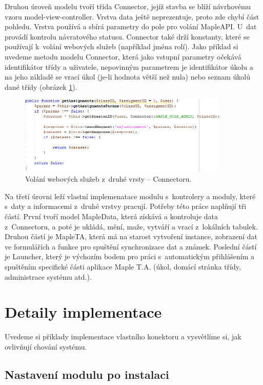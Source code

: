 \documentclass[
print,
  11pt,
  table,   
  nolof,    
  nolot,
  oneside,
  draft
]{fithesis3}
\begin{document}
Druhou úroveň modelu tvoří třída Connector, jejíž stavba se blíží návrhovému vzoru model-view-controller. Vrstva data ještě neprezentuje, proto zde chybí část pohledu. Vrstva používá a sbírá parametry do pole pro volání MapleAPI. U~dat provádí kontrolu návratového statusu. Connector také drží konstanty, které se používají k~volání webových služeb (například jména rolí). Jako příklad si uvedeme metodu modelu Connector, která jako vstupní parametry očekává identifikátor třídy a uživatele, nepovinným parametrem je identifikátor úkolu a na jeho základě se vrací úkol (je-li hodnota větší než nula) nebo seznam úkolů dané třídy (obrázek \ref{fig:volanizconnectoru}).
		\begin{figure}
		  \begin{center}
		    \includegraphics[width=100mm]{images/priklad_volani_z_connectoru.png}
		   \end{center}
		  \caption{Volání webových služeb z~druhé vrsty -- Connectoru.}
		  \label{fig:volanizconnectoru}
		\end{figure}

Na třetí úrovni leží vlastní implemenatace modulu s~kontrolery a moduly, které s~daty a informacemi z~druhé vrstvy pracují. Potřeby této práce naplňují tři částí. První tvoří model MapleData, která získává a kontroluje data z~Connectoru, a poté je ukládá, mění, maže, vytváří a vrací z~lokálních tabulek. Druhou částí je MapleTA, která má na starost vytvoření instance, zobrazení dat ve formulářích a funkce pro spuštění synchronizace dat a známek. Poslední částí je Launcher, který je výchozím bodem pro práci s~automatickým přihlášením a spuštěním specifické části aplikace Maple T.A. (úkol, domácí stránka třídy, administrace systému atd.).

	\section{Detaily implementace}
Uvedeme si příklady implementace vlastního konektoru a vysvětlíme si, jak ovlivňují chování systému.
\subsection{Nastavení modulu po instalaci}
\end{document}
